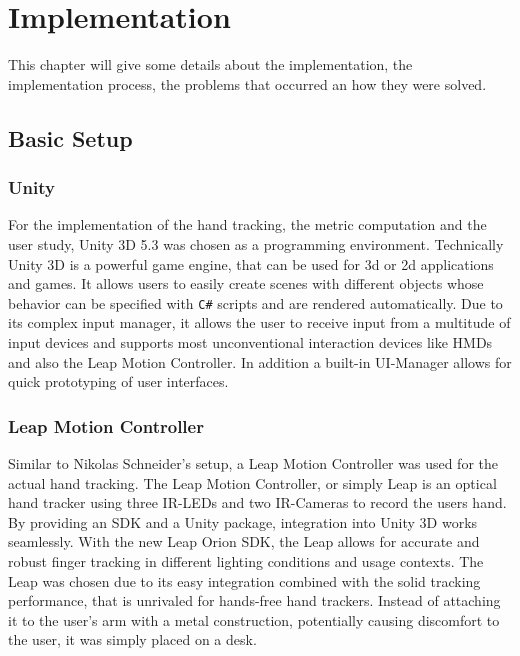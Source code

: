 \chapter{Implementation}\label{chapter:implementation}

This chapter will give some details about the implementation, the implementation process, the problems that occurred an how they were solved.

\section{Basic Setup}

\subsection{Unity}

For the implementation of the hand tracking, the metric computation and the user study, Unity 3D 5.3 was chosen as a programming environment. Technically Unity 3D is a powerful game engine, that can be used for 3d or 2d applications and games. It allows users to easily create scenes with different objects whose behavior can be specified with \texttt{C\#} scripts and are rendered automatically. Due to its complex input manager, it allows the user to receive input from a multitude of input devices and supports most unconventional interaction devices like HMDs and also the Leap Motion Controller. In addition a built-in UI-Manager allows for quick prototyping of user interfaces. 

\subsection{Leap Motion Controller}

Similar to Nikolas Schneider's setup, a Leap Motion Controller was used for the actual hand tracking. The Leap Motion Controller, or simply Leap is an optical hand tracker using three IR-LEDs and two IR-Cameras to record the users hand. By providing an SDK and a Unity package, integration into Unity 3D works seamlessly. With the new Leap Orion SDK, the Leap allows for accurate and robust finger tracking in different lighting conditions and usage contexts. The Leap was chosen due to its easy integration combined with the solid tracking performance, that is unrivaled for hands-free hand trackers.  
Instead of attaching it to the user's arm with a metal construction, potentially causing discomfort to the user, it was simply placed on a desk. 

